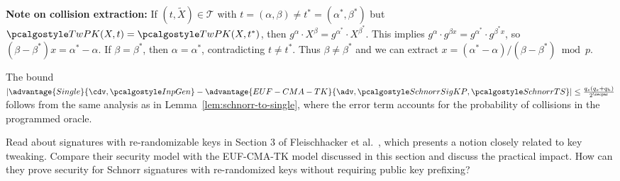 \begin{mysolution}
  \textbf{Note on collision extraction:} If $(t, \tilde{X}) \in \mathcal{T}$ with $t = (\alpha, \beta) \neq t^* = (\alpha^*, \beta^*)$ but $\algo{TwPK}(X, t) = \algo{TwPK}(X, t^*)$, then $g^\alpha \cdot X^\beta = g^{\alpha^*} \cdot X^{\beta^*}$.
  This implies $g^\alpha \cdot g^{\beta x} = g^{\alpha^*} \cdot g^{\beta^* x}$, so $(\beta - \beta^*)x = \alpha^* - \alpha$.
  If $\beta = \beta^*$, then $\alpha = \alpha^*$, contradicting $t \neq t^*$.
  Thus $\beta \neq \beta^*$ and we can extract $x = (\alpha^* - \alpha)/(\beta - \beta^*) \bmod p$.
  
  The bound $|\advantage{Single}{\cdv, \algo{InpGen}} - \advantage{EUF-CMA-TK}{\adv, \algo{SchnorrSigKP}, \algo{SchnorrTS}}| \leq \frac{q_s(q_s + q_h)}{2^\secpar}$ follows from the same analysis as in Lemma~\ref{lem:schnorr-to-single}, where the error term accounts for the probability of collisions in the programmed oracle.
\end{mysolution}
\fi

\begin{exercise}[Optional]
  Read about signatures with re-randomizable keys in Section 3 of Fleischhacker et al.~\cite{PKC:FKMSSS16}, which presents a notion closely related to key tweaking.
  Compare their security model with the EUF-CMA-TK model discussed in this section and discuss the practical impact.
  How can they prove security for Schnorr signatures with re-randomized keys without requiring public key prefixing?
\end{exercise}
